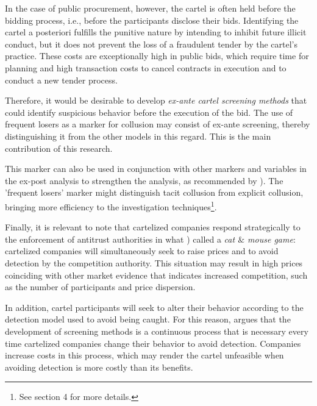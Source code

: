  In the case of public procurement, however, the cartel is often held before the bidding process, i.e., before the participants disclose their bids. Identifying the cartel a posteriori fulfills the punitive nature by intending to inhibit future illicit conduct, but it does not prevent the loss of a fraudulent tender by the cartel's practice. These costs are exceptionally high in public bids, which require time for planning and high transaction costs to cancel contracts in execution and to conduct a new tender process.

Therefore, it would be desirable to develop \textit{ex-ante cartel screening methods} that could identify suspicious behavior before the execution of the bid. The use of frequent losers as a marker for collusion may consist of ex-ante screening, thereby distinguishing it from the other models in this regard. This is the main contribution of this research.

This marker can also be used in conjunction with other markers and variables in the ex-post analysis to strengthen the analysis, as recommended by  \cite{harrington2008detecting}). The 'frequent losers' marker might distinguish tacit collusion from explicit collusion, bringing more efficiency to the investigation techniques\footnote{ See section 4 for more details.}.

 Finally, it is relevant to note that cartelized companies respond strategically to the enforcement of antitrust authorities in what  \cite{schinkel2013balancing}) called a \textit{cat $\&$ mouse game}: cartelized companies will simultaneously seek to raise prices and to avoid detection by the competition authority. This situation may result in high prices coinciding with other market evidence that indicates increased competition, such as the number of participants and price dispersion.

 In addition, cartel participants will seek to alter their behavior according to the detection model used to avoid being caught. For this reason,  \cite{schinkel2013balancing} argues that the development of screening methods is a continuous process that is necessary every time cartelized companies change their behavior to avoid detection. Companies increase costs in this process, which may render the cartel unfeasible when avoiding detection is more costly than its benefits.
